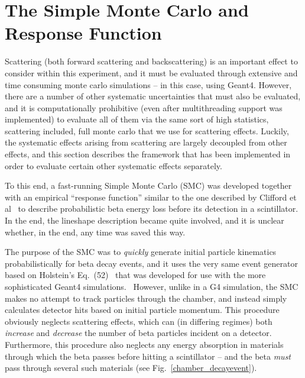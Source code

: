 \FloatBarrier
\section{The Simple Monte Carlo and Response Function}
\label{sec:responsefunction}
Scattering (both forward scattering and backscattering) is an important effect to consider within this experiment, and it must be evaluated through extensive and time consuming monte carlo simulations -- in this case, using Geant4.  However, there are a number of other systematic uncertainties that must also be evaluated, and it is computationally prohibitive (even after multithreading support was implemented) to evaluate all of them via the same sort of high statistics, scattering included, full monte carlo that we use for scattering effects.  Luckily, the systematic effects arising from scattering are largely decoupled from other effects, and this section describes the framework that has been implemented in order to evaluate certain other systematic effects separately.  


To this end, a fast-running Simple Monte Carlo (SMC) was developed together with an empirical ``response function'' similar to the one described by Clifford et al~\cite{clifford} to describe probabilistic beta energy loss before its detection in a scintillator.  In the end, the lineshape description became quite involved, and it is unclear whether, in the end, any time was saved this way. 

The purpose of the SMC was to \emph{quickly} generate initial particle kinematics probabilistically for beta decay events, and it uses the very same event generator based on Holstein's Eq.~(52)~\cite{holstein} that was developed for use with the more sophisticated Geant4 simulations.~  However, unlike in a G4 simulation, the SMC makes no attempt to track particles through the chamber, and instead simply calculates detector hits based on initial particle momentum.  This procedure obviously neglects scattering effects, which can (in differing regimes) both \emph{increase} and \emph{decrease} the number of beta particles incident on a detector.  Furthermore, this procedure also neglects any energy absorption in materials through which the beta passes before hitting a scintillator -- and the beta \emph{must} pass through several such materials (see Fig.~\ref{chamber_decayevent}).

